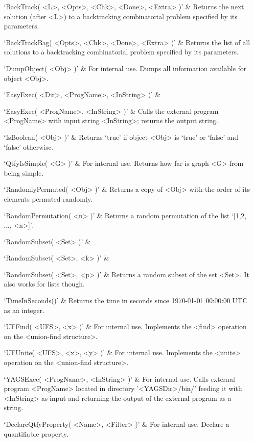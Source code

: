 \beginitems
`BackTrack( <L>, <Opts>, <Chk>, <Done>, <Extra> )' & 
Returns the next solution (after <L>) to a backtracking combinatorial problem specified by its parameters.

`BackTrackBag( <Opts>, <Chk>, <Done>, <Extra> )' & 
Returns the list of all solutions to a backtracking combinatorial problem specified by its parameters.
\enditems


\beginitems
`DumpObject( <Obj> )' & 
For internal use. Dumps  all information available for object <Obj>.

`EasyExec( <Dir>, <ProgName>, <InString> )' & 

`EasyExec( <ProgName>, <InString> )' & 
Calls the external program <ProgName> with input string <InString>; returns the output string.

`IsBoolean( <Obj> )' & 
Returns `true' if object <Obj> is `true' or `false' and `false' otherwise.

`QtfyIsSimple( <G> )' & 
For internal use. Returns how far is graph <G> from being simple.

`RandomlyPermuted( <Obj> )' & 
Returns  a copy of <Obj> with the order of its elements permuted randomly.

`RandomPermutation( <n> )' & 
Returns a random permutation of the list `[1,2, ..., <n>]'.

`RandomSubset( <Set> )' &

`RandomSubset( <Set>, <k> )' &

`RandomSubset( <Set>, <p> )' &
Returns a random subset of the set <Set>. It also works for lists though.

`TimeInSeconds()' & 
Returns the time in seconds since 1970-01-01 00:00:00 UTC as an integer.

`UFFind( <UFS>, <x> )' & 
For  internal  use.  Implements  the  <find>  operation on the <union-find structure>. 

`UFUnite( <UFS>, <x>, <y> )' & 
For  internal  use.  Implements  the  <unite> operation on the <union-find structure>.

`YAGSExec( <ProgName>, <InString> )' & 
For  internal  use.  Calls  external  program  <ProgName> located in directory
'<YAGSDir>/bin/'  feeding  it with <InString> as input and returning  the
output  of  the  external  program  as a string.
\enditems


\beginitems
`DeclareQtfyProperty( <Name>, <Filter> )' & 
For internal use. Declare a quantifiable property.

